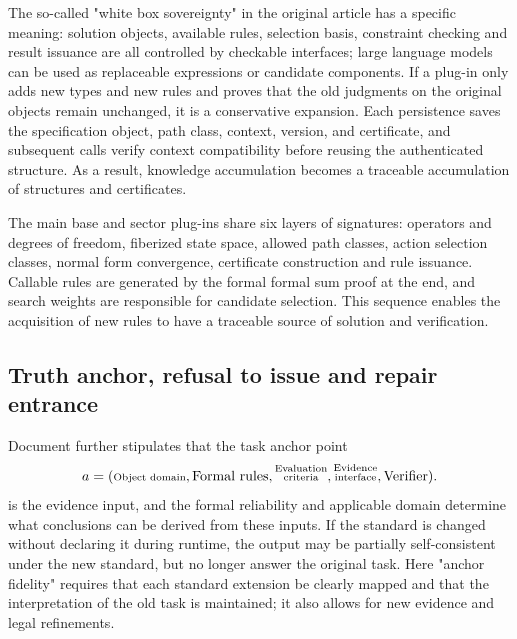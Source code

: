 \documentclass[11pt,a4paper]{article}
\theoremstyle{plain}
\theoremstyle{definition}
\theoremstyle{remark}
\begin{document}
\begin{CJK*}
The so-called "white box sovereignty" in the original article has a specific meaning: solution objects, available rules, selection basis, constraint checking and result issuance are all controlled by checkable interfaces; large language models can be used as replaceable expressions or candidate components. If a plug-in only adds new types and new rules and proves that the old judgments on the original objects remain unchanged, it is a conservative expansion. Each persistence saves the specification object, path class, context, version, and certificate, and subsequent calls verify context compatibility before reusing the authenticated structure. As a result, knowledge accumulation becomes a traceable accumulation of structures and certificates.

The main base and sector plug-ins share six layers of signatures: operators and degrees of freedom, fiberized state space, allowed path classes, action selection classes, normal form convergence, certificate construction and rule issuance. Callable rules are generated by the formal formal sum proof at the end, and search weights are responsible for candidate selection. This sequence enables the acquisition of new rules to have a traceable source of solution and verification.

\subsection { Truth anchor, refusal to issue and repair entrance }

Document \cite{S30,S31} further stipulates that the task anchor point \[
 a=(\text{\shortstack[c]{\scriptsize Object domain}},\text{Formal rules},\text{\shortstack[c]{\scriptsize Evaluation\\[-1pt]\scriptsize criteria}},\text{\shortstack[c]{\scriptsize Evidence\\[-1pt]\scriptsize interface}},\text{Verifier}).
\] is the evidence input, and the formal reliability and applicable domain determine what conclusions can be derived from these inputs. If the standard is changed without declaring it during runtime, the output may be partially self-consistent under the new standard, but no longer answer the original task. Here "anchor fidelity" requires that each standard extension be clearly mapped and that the interpretation of the old task is maintained; it also allows for new evidence and legal refinements.


\end{CJK*}
\end{document}
